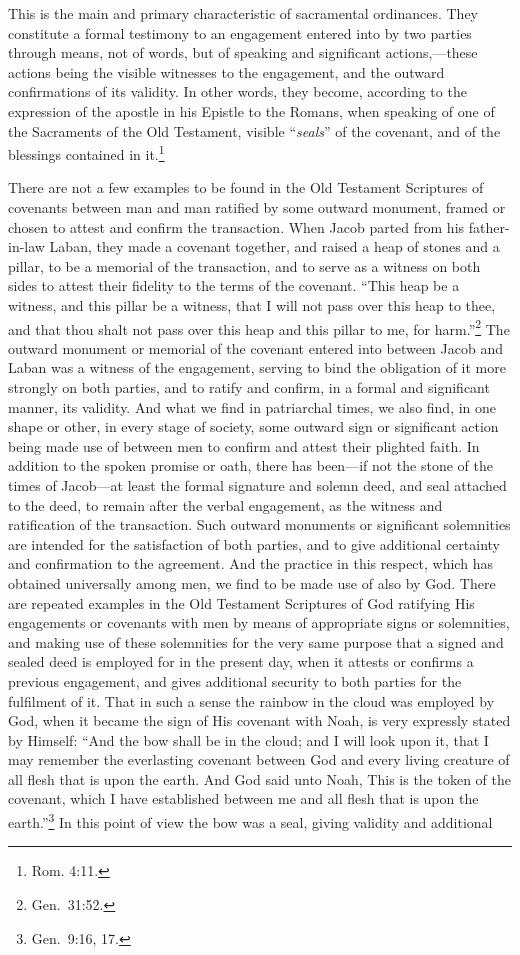 \documentclass[english,]{book}
\begin{document}
This is the main and primary characteristic of sacramental ordinances. They constitute a formal testimony to an engagement entered into by two parties through means, not of words, but of speaking and significant actions,---these actions being the visible witnesses to the engagement, and the outward confirmations of its validity. In other words, they become, according to the expression of the apostle in his Epistle to the Romans, when speaking of one of the Sacraments of the Old Testament, visible ``\emph{seals}'' of the covenant, and of the blessings contained in it.\footnote{Rom. 4:11.}

There are not a few examples to be found in the Old Testament Scriptures of covenants between man and man ratified by some outward monument, framed or chosen to attest and confirm the transaction. When Jacob parted from his father-in-law Laban, they made a covenant together, and raised a heap of stones and a pillar, to be a memorial of the transaction, and to serve as a witness on both sides to attest their fidelity to the terms of the covenant. ``This heap be a witness, and this pillar be a witness, that I will not pass over this heap to thee, and that thou shalt not pass over this heap and this pillar to me, for harm.''\footnote{Gen.~31:52.} The outward monument or memorial of the covenant entered into between Jacob and Laban was a witness of the engagement, serving to bind the obligation of it more strongly on both parties, and to ratify and confirm, in a formal and significant manner, its validity. And what we find in patriarchal times, we also find, in one shape or other, in every stage of society, some outward sign or significant action being made use of between men to confirm and attest their plighted faith. In addition to the spoken promise or oath, there has been---if not the stone of the times of Jacob---at least the formal signature and solemn deed, and seal attached to the deed, to remain after the verbal engagement, as the witness and ratification of the transaction. Such outward monuments or significant solemnities are intended for the satisfaction of both parties, and to give additional certainty and confirmation to the agreement. And the practice in this respect, which has obtained universally among men, we find to be made use of also by God. There are repeated examples in the Old Testament Scriptures of God ratifying His engagements or covenants with men by means of appropriate signs or solemnities, and making use of these solemnities for the very same purpose that a signed and sealed deed is employed for in the present day, when it attests or confirms a previous engagement, and gives additional security to both parties for the fulfilment of it. That in such a sense the rainbow in the cloud was employed by God, when it became the sign of His covenant with Noah, is very expressly stated by Himself: ``And the bow shall be in the cloud; and I will look upon it, that I may remember the everlasting covenant between God and every living creature of all flesh that is upon the earth. And God said unto Noah, This is the token of the covenant, which I have established between me and all flesh that is upon the earth.''\footnote{Gen.~9:16, 17.} In this point of view the bow was a seal, giving validity and additional 
\end{document}
